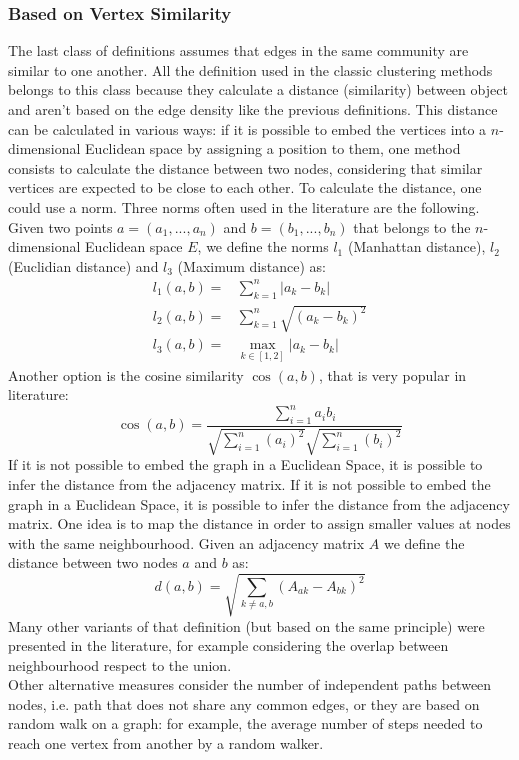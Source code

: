 \subsubsection{Based on Vertex Similarity}
The last class of definitions assumes that edges in the same community are similar to one another. All the definition used in the classic clustering methods belongs to this class because they calculate a distance (similarity) between object and aren't based on the edge density like the previous definitions. This distance can be calculated in various ways:  if it is possible to embed the vertices into a $n$-dimensional Euclidean space by assigning a position to them, one method consists to calculate the distance between two nodes, considering that similar vertices are expected to be close to each other. To calculate the distance, one could use a norm. Three norms often used in the literature are the following. Given two points $a=(a_1, ... , a_n)$ and $b=(b_1, ... , b_n)$ that belongs to the $n$-dimensional Euclidean space $E$, we define the norms $l_1$ (Manhattan distance), $l_2$ (Euclidian distance) and $l_3$ (Maximum distance) as:
\begin{align}
l_1(a,b) =&\sum_{k=1}^{n} |a_k - b_k|\\
l_2(a,b) =&\sum_{k=1}^{n} \sqrt{(a_k -b_k)^2}\\
l_3(a,b) =&\max_{k \in [1,2]} |a_k - b_k|
\end{align}
Another option is the cosine similarity $\cos(a, b)$, that is very popular in literature:
\begin{equation}
\cos (a,b) = \frac{ \sum_{i=1}^{n}{{a}_i{b}_i} }{ \sqrt{\sum_{i=1}^{n}{({a}_i)^2}} \sqrt{\sum_{i=1}^{n}{({b}_i)^2}} }
\end{equation}
If it is not possible to embed the graph in a Euclidean Space, it is possible to infer the distance from the adjacency matrix. 
If it is not possible to embed the graph in a Euclidean Space, it is possible to infer the distance from the adjacency matrix. One idea is to map the distance in order to assign smaller values at nodes with the same neighbourhood. Given an adjacency matrix $A$ we define the distance between two nodes $a$ and $b$ as:
\begin{equation}
d(a,b) = \sqrt{\sum_{k\ne a,b} (A_{ak} - A_{bk})^2} 
\end{equation}
Many other variants of that definition (but based on the same principle) were presented in the literature, for example considering the overlap between neighbourhood respect to the union. \\
Other alternative measures consider the number of independent paths between nodes, i.e. path that does not share any common edges, or they are based on random walk on a graph: for example, the average number of steps needed to reach one vertex from another by a random walker.  

